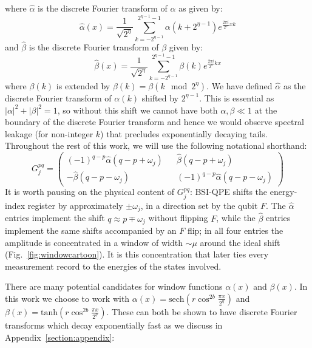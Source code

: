 \documentclass[aps,floatfix,10pt,amssymb,amsfont,amsmath,superscriptaddress,float,nofootinbib,longbibliography,nobalancelastpage,twocolumn]{revtex4-2}
\begin{document}
\begin{widetext}
where $\hat \alpha$ is the discrete Fourier transform of $\alpha$ as given by:
\begin{equation}
   \hat\alpha(x) =\frac{1}{\sqrt{2^{\eta}}}\sum_{k=-2^{\eta-1}}^{2^{\eta-1}-1} \alpha(k+2^{\eta-1})e^{\frac{2\pi i}{2^{\eta}}xk}
\end{equation}
and $\hat \beta$ is the discrete Fourier transform of $\beta$ given by:
\begin{equation}
    \hat\beta(x) =\frac{1}{\sqrt{2^{\eta}}}\sum_{k=-2^{\eta-1}}^{2^{\eta-1}-1} \beta(k)e^{\frac{2\pi i}{2^{\eta}}kx}
\end{equation}
 where $\beta(k)$ is extended by $\beta(k) = \beta(k \mod 2^{\eta})$. We have defined $\hat \alpha$ as the discrete Fourier transform of $\alpha(k)$ shifted by $2^{\eta-1}$. This is essential as $|\alpha|^2+|\beta|^2=1$, so without this shift we cannot have both $\alpha, \beta \ll1$ at the boundary of the discrete Fourier transform and hence we would observe spectral leakage (for non-integer $k$) that precludes exponentially decaying tails. Throughout the rest of this work, we will use the following notational shorthand: 
\begin{equation}
\label{eq:G}
    G_j^{pq} = \begin{pmatrix}
        (-1)^{q-p}\hat\alpha(q-p+\omega_{j}) && \hat\beta(q-p+\omega_{j})\\
        -\hat\beta (q-p-\omega_{j}) && (-1)^{q-p}\hat\alpha(q-p-\omega_{j})
    \end{pmatrix}
\end{equation}
It is worth pausing on the physical content of $G^{pq}_j$: BSI-QPE shifts the energy-index register by approximately $\pm\omega_j$, in a direction set by the qubit $F$. The $\hat\alpha$ entries implement the shift $q \approx p \mp \omega_j$ without flipping $F$, while the $\hat\beta$ entries implement the same shifts accompanied by an $F$ flip; in all four entries the amplitude is concentrated in a window of width $\sim\mu$ around the ideal shift (Fig.~\ref{fig:windowcartoon}). It is this concentration that later ties every measurement record to the energies of the states involved.
\end{widetext}
There are many potential candidates for window functions $\alpha(x)$ and $\beta(x)$. In this work we choose to work with $\alpha(x) = \text{sech}( r\cos^{2b} \frac{\pi x}{2^{\eta}})$ and $\beta(x) = \text{tanh}(r \cos^{2b} \frac{\pi x}{2^{\eta}})$. These can both be shown to have discrete Fourier transforms which decay exponentially fast as we discuss in Appendix~\ref{section:appendix}:
\end{document}
